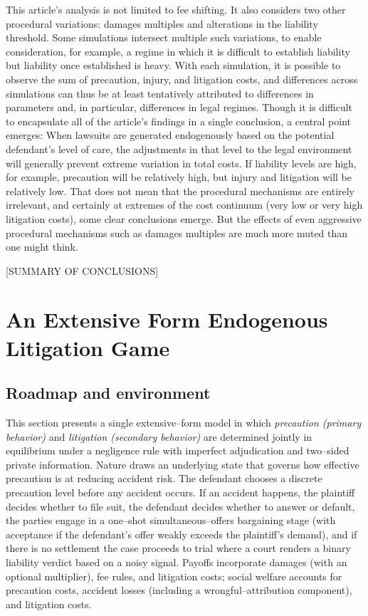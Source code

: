 \documentclass{article}
\begin{document}
This article's analysis is not limited to fee shifting. It also considers two other procedural variations: damages multiples and alterations in the liability threshold. Some simulations intersect multiple such variations, to enable consideration, for example, a regime in which it is difficult to establish liability but liability once established is heavy. With each simulation, it is possible to observe the sum of precaution, injury, and litigation costs, and differences across simulations can thus be at least tentatively attributed to differences in parameters and, in particular, differences in legal regimes. Though it is difficult to encapsulate all of the article's findings in a single conclusion, a central point emerges: When lawsuits are generated endogenously based on the potential defendant's level of care, the adjustments in that level to the legal environment will generally prevent extreme variation in total costs. If liability levels are high, for example, precaution will be relatively high, but injury and litigation will be relatively low. That does not mean that the procedural mechanisms are entirely irrelevant, and certainly at extremes of the cost continuum (very low or very high litigation costs), some clear conclusions emerge. But the effects of even aggressive procedural mechanisms such as damages multiples are much more muted than one might think. 

[SUMMARY OF CONCLUSIONS]

\section{An Extensive Form Endogenous Litigation Game}

 \subsection{Roadmap and environment}
This section presents a single extensive--form model in which \emph{precaution (primary behavior)} and \emph{litigation (secondary behavior)} are determined jointly in equilibrium under a negligence rule with imperfect adjudication and two--sided private information. Nature draws an underlying state that governs how effective precaution is at reducing accident risk. The defendant chooses a discrete precaution level before any accident occurs. If an accident happens, the plaintiff decides whether to file suit, the defendant decides whether to answer or default, the parties engage in a one--shot simultaneous--offers bargaining stage (with acceptance if the defendant’s offer weakly exceeds the plaintiff’s demand), and if there is no settlement the case proceeds to trial where a court renders a binary liability verdict based on a noisy signal. Payoffs incorporate damages (with an optional multiplier), fee rules, and litigation costs; social welfare accounts for precaution costs, accident losses (including a wrongful--attribution component), and litigation costs.
\end{document}
